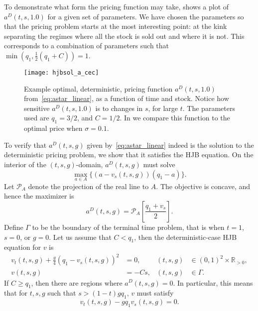 \documentclass[main.tex]{subfiles}
\begin{document}
\begin{example}\label{ex:acecplot}
  To demonstrate what form the pricing function may take,
   shows a plot of $a^D(t,s,1.0)$ for a given set of
  parameters. We have chosen the parameters so that the pricing
  problem starts at the most interesting point: at the kink separating
  the regimes where all the stock is sold out and where it is not.
  This corresponds to a combination of parameters such that
  $\min(q_1,\frac{1}{2}(q_1+C))=1$.

  \begin{figure}[htbp]
    \centering
    \texttt{[image: hjbsol\_a\_cec]}
    \caption*{$a^D(t,s,1.0)$}
    \caption{Example optimal, deterministic, pricing function $a^D(t,s,1.0)$
      from~\eqref{eq:astar_linear}, as a function of time and stock.
      Notice how sensitive $a^D(t,s,1.0)$ is to changes in $s$, for large
      $t$.
      The parameters used are $q_1=3/2$, and $C=1/2$.
      In  we compare this function to the optimal price
      when $\sigma=0.1$.
    }\label{fig:hjbsol_a_cec}
  \end{figure}
\end{example}

To verify that $a^D(t,s,g)$ given by~\eqref{eq:astar_linear} indeed is
the solution to the deterministic
pricing problem, we show that it satisfies the HJB equation.
On the interior of the $(t,s,g)$-domain, $a^D(t,s,g)$ must solve
\begin{equation}
  \max_{a\in A} \{(a-v_s(t,s,g))(q_1-a)\}.
\end{equation}
Let $\mathcal P_A$ denote the projection of the real line to $A$. The
objective is concave, and hence the maximizer is
\begin{equation}\label{eq:astar_hjb_linear}
  a^D(t,s,g) = \mathcal P_A\left[\frac{q_1+v_s}{2}\right].
\end{equation}
Define $\Gamma$ to be the boundary of the terminal time problem,
that is when $t=1$, $s=0$, or $g=0$.
Let us assume that $C< q_1$, then the
deterministic-case HJB equation for $v$ is
\begin{align}\label{eq:hjb_linear}
  v_t(t,s,g)+
  \frac{g}{4}{( q_1-v_s(t,s,g))}^2
  &=0,&(t,s,g)&\in{(0,1)}^2\times \mathbb R_{>0},\\
  v(t,s,g) &= -Cs,&(t,s,g)&\in \Gamma.
\end{align}
If $C\geq q_1$, then there are regions where $a^D(t,s,g)=0$. In
particular, this means that for $t,s,g$ such that
$s>(1-t)gq_1$, $v$ must satisfy
\begin{equation}\label{eq:hjb_linear_Clarge}
  v_t(t,s,g) - gq_1v_s(t,s,g)=0.
\end{equation}
\end{document}
